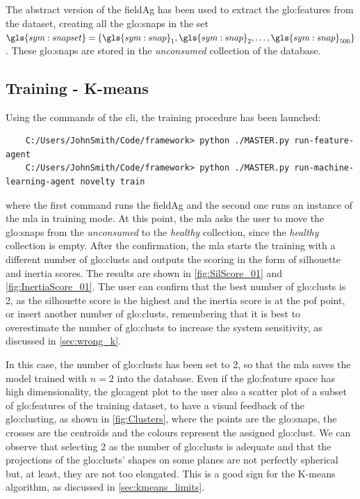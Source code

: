 The abstract version of the \gls{fieldAg} has been used to extract the \gls{glo:feature}s from the dataset, creating all the \gls{glo:snap}s in the set $\gls{sym:snapset}=\{\gls{sym:snap}_1,\gls{sym:snap}_2,\dots,\gls{sym:snap}_{500}\}$. These \gls{glo:snap}s are stored in the \emph{unconsumed} collection of the database.

\subsection{Training - K-means}

Using the commands of the \gls{cli}, the training procedure has been launched:
\begin{verbatim}
    C:/Users/JohnSmith/Code/framework> python ./MASTER.py run-feature-agent
    C:/Users/JohnSmith/Code/framework> python ./MASTER.py run-machine-learning-agent novelty train
\end{verbatim}

where the first command runs the \gls{fieldAg} and the second one runs an  instance of the \gls{mla} in training mode.
At this point, the \gls{mla} asks the user to move the \gls{glo:snap}s from the \emph{unconsumed} to the \emph{healthy} collection, since the \emph{healthy} collection is empty. After the confirmation, the \gls{mla} starts the training with a different number of \gls{glo:clust}s and outputs the scoring in the form of silhouette and inertia scores. The results are shown in \autoref{fig:SilScore_01} and \autoref{fig:InertiaScore_01}. The user can confirm that the best number of \gls{glo:clust}s is 2, as the silhouette score is the highest and the inertia score is at the \gls{pof} point, or insert another number of \gls{glo:clust}s, remembering that it is best to overestimate the number of \gls{glo:clust}s to increase the system sensitivity, as discussed in \autoref{sec:wrong_k}. 

In this case, the number of \gls{glo:clust}s has been set to 2, so that the \gls{mla} saves the model trained with $n=2$ into the database. Even if the \gls{glo:feature} space has high dimensionality, the \gls{glo:agent} plot to the user also a scatter plot of a subset of \gls{glo:feature}s of the training dataset, to have a visual feedback of the \gls{glo:clust}ing, as shown in \autoref{fig:Clusters}, where the points are the \gls{glo:snap}s, the crosses are the centroids and the colours represent the assigned \gls{glo:clust}. We can observe that selecting 2 as the number of \gls{glo:clust}s is adequate and that the projections of the \gls{glo:clust}s' shapes on some planes are not perfectly spherical but, at least, they are not too elongated. This is a good sign for the K-means algorithm, as discussed in \autoref{sec:kmeans_limits}.

